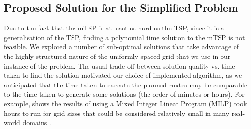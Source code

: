 \subsection{Proposed Solution for the Simplified Problem}
Due to the fact that the mTSP is at least as hard as the TSP, since it is a generalisation of the TSP, finding a polynomial time solution to the mTSP is not feasible. We explored a number of sub-optimal solutions that take advantage of the highly structured nature of the uniformly spaced grid that we use in our instance of the problem. The usual trade-off between solution quality vs. time taken to find the solution motivated our choice of implemented algorithm, as we anticipated that the time taken to execute the planned routes may be comparable to the time taken to generate some solutions (the order of minutes or hours). For example, \citeauthor{Hungerlander2018TheGrids} shows the results of using a Mixed Integer Linear Program (MILP) took hours to run for grid sizes that could be considered relatively small in many real-world domains \cite{Hungerlander2018TheGrids}.

